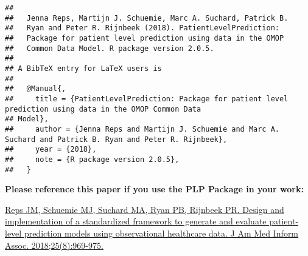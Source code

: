 \documentclass[]{article}
\begin{document}
\begin{verbatim}
## 
##   Jenna Reps, Martijn J. Schuemie, Marc A. Suchard, Patrick B.
##   Ryan and Peter R. Rijnbeek (2018). PatientLevelPrediction:
##   Package for patient level prediction using data in the OMOP
##   Common Data Model. R package version 2.0.5.
## 
## A BibTeX entry for LaTeX users is
## 
##   @Manual{,
##     title = {PatientLevelPrediction: Package for patient level prediction using data in the OMOP Common Data
## Model},
##     author = {Jenna Reps and Martijn J. Schuemie and Marc A. Suchard and Patrick B. Ryan and Peter R. Rijnbeek},
##     year = {2018},
##     note = {R package version 2.0.5},
##   }
\end{verbatim}

\textbf{Please reference this paper if you use the PLP Package in your
work:}

\href{http://dx.doi.org/10.1093/jamia/ocy032}{Reps JM, Schuemie MJ,
Suchard MA, Ryan PB, Rijnbeek PR. Design and implementation of a
standardized framework to generate and evaluate patient-level prediction
models using observational healthcare data. J Am Med Inform Assoc.
2018;25(8):969-975.}
\end{document}
